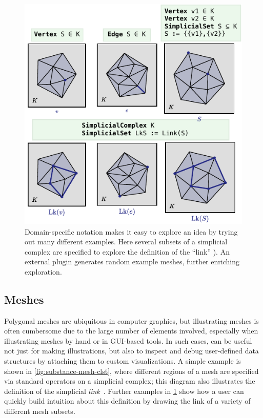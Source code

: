 \begin{figure}
   \centering
   \includegraphics[scale=1.5]{assets/penrose/mesh-examples.pdf}
   \caption{Domain-specific notation makes it easy to explore an idea by trying out many different examples.  Here several subsets of a simplicial complex are specified  to explore the definition of the ``link'' ).  An external plugin generates random example meshes, further enriching exploration.\label{fig:mesh-examples}}
\end{figure}

\subsection{Meshes}
\label{sec:Meshes}

Polygonal meshes are ubiquitous in computer graphics, but illustrating meshes is often cumbersome due to the large number of elements involved, especially when illustrating meshes by hand or in GUI-based tools.  In such cases, \Penrose{} can be useful not just for making illustrations, but also to inspect and debug user-defined data structures by attaching them to custom visualizations.  A simple example is shown in \cref{fig:substance-mesh-clst}, where different regions of a mesh are specified via standard operators on a simplicial complex; this diagram also illustrates the definition of the simplicial \emph{link}~\cite[Section 3.3]{Bloch:1997:FCG}.  Further examples in \cref{fig:mesh-examples} show how a user can quickly build intuition about this definition by drawing the link of a variety of different mesh subsets.

